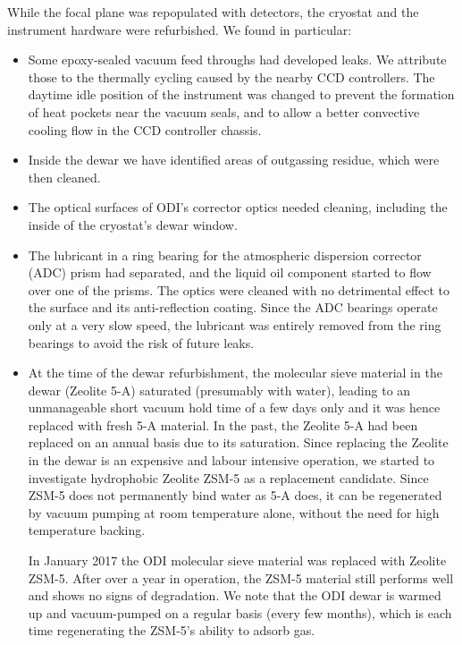 \documentclass[]{spieman}
\begin{document}
While the focal plane was repopulated with detectors, the cryostat and the 
instrument hardware were refurbished. We found in particular:
\begin{itemize}
	\item Some epoxy-sealed vacuum feed throughs had developed  leaks. We 
	attribute those to the thermally cycling caused by the nearby CCD controllers. 
	The daytime idle position of the instrument was changed to prevent the 
	formation of heat pockets near the vacuum seals, and to allow a better
	convective cooling flow in the CCD controller chassis.
	
	\item Inside the dewar we have identified areas of outgassing residue, which 
	were then cleaned.

	\item The optical surfaces of ODI's corrector optics needed cleaning,
	 including the inside of the cryostat's dewar window. 
	
	\item The lubricant in a ring bearing for the atmospheric dispersion 
	corrector (ADC) prism had separated, and the liquid oil component started to 
	flow over one of the prisms. The optics were cleaned with no detrimental effect 
	to the surface and its anti-reflection coating. Since the ADC bearings operate 
	only at a very slow speed, the lubricant was entirely removed from the 
	ring bearings to avoid the risk of future leaks. 
	

\item  At the time of the dewar refurbishment, the molecular sieve material in
the dewar (Zeolite 5-A) saturated (presumably with water), leading to an
unmanageable short vacuum hold time of a few days only and it was hence replaced
with fresh 5-A material. In the past, the Zeolite 5-A had been replaced on an
annual basis due to its saturation. Since replacing the Zeolite in the dewar is
an expensive and labour intensive operation, we started to investigate
hydrophobic Zeolite ZSM-5 as a replacement candidate. Since ZSM-5 does not
permanently bind water as 5-A does, it can be regenerated by vacuum pumping at
room temperature alone, without the need for high temperature backing.

In January 2017 the ODI molecular sieve material was replaced with Zeolite
ZSM-5. After over a year in operation, the ZSM-5 material still performs well
and shows no signs of degradation. We note that the ODI dewar is warmed up and
vacuum-pumped on a regular basis (every few months), which is each time
regenerating the ZSM-5's ability to adsorb gas.

\end{itemize}
\end{document}
